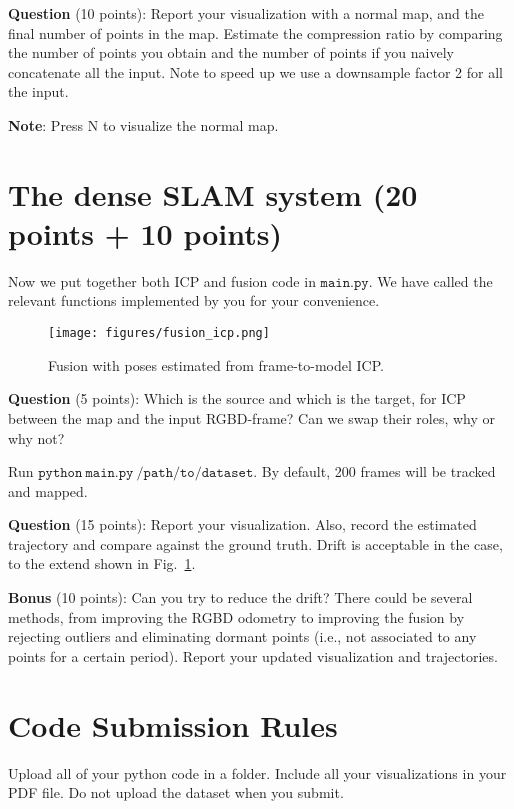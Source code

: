 \documentclass[12pt, a4paper]{article}
\begin{document}
\textbf{Question} (10 points): Report your visualization with a normal map, and the final number of points in the map. Estimate the compression ratio by comparing the number of points you obtain and the number of points if you naively concatenate all the input. Note to speed up we use a downsample factor 2 for all the input.

\textbf{Note}: Press N to visualize the normal map.

\section{The dense SLAM system (20 points + 10 points)}
Now we put together both ICP and fusion code in $\mathtt{main.py}$. We have called the relevant functions implemented by you for your convenience.

\begin{figure}
    \texttt{[image: figures/fusion\_icp.png]}
    \caption{Fusion with poses estimated from frame-to-model ICP.}\label{fig:fusion-icp}
\end{figure}
\textbf{Question} (5 points): Which is the source and which is the target, for ICP between the map and the input RGBD-frame? Can we swap their roles, why or why not?

Run $\mathtt{python~main.py~/path/to/dataset}$. By default, 200 frames will be tracked and mapped.

\textbf{Question} (15 points): Report your visualization. Also, record the estimated trajectory and compare against the ground truth. Drift is acceptable in the case, to the extend shown in Fig.~\ref{fig:fusion-icp}.

\textbf{Bonus} (10 points): Can you try to reduce the drift? There could be several methods, from improving the RGBD odometry to improving the fusion by rejecting outliers and eliminating dormant points (i.e., not associated to any points for a certain period). Report your updated visualization and trajectories.

\section{Code Submission Rules}

Upload all of your python code in a folder.
Include all your visualizations in your PDF file.
Do not upload the dataset when you submit.
\end{document}
